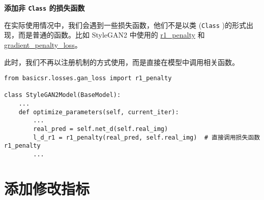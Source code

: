 \documentclass[../main.tex]{subfiles}
\begin{document}
\begin{hl} %
    \textbf{添加非 \texttt{Class} 的损失函数}

    在实际使用情况中，我们会遇到一些损失函数，他们不是以类 (\texttt{Class} )的形式出现，而是普通的函数。比如 StyleGAN2 中使用的 \href{https://github.com/XPixelGroup/BasicSR/blob/master/basicsr/losses/gan_loss.py}{r1\_penalty} 和 \href{https://github.com/XPixelGroup/BasicSR/blob/master/basicsr/losses/gan_loss.py}{gradient\_penalty\_loss}。

    此时，我们不再以注册机制的方式使用，而是直接在模型中调用相关函数。
\begin{verbatim}
from basicsr.losses.gan_loss import r1_penalty

class StyleGAN2Model(BaseModel):
    ...
    def optimize_parameters(self, current_iter):
        ...
        real_pred = self.net_d(self.real_img)
        l_d_r1 = r1_penalty(real_pred, self.real_img)  # 直接调用损失函数 r1_penalty
        ...
\end{verbatim}
\end{hl}

\section{添加修改指标}\label{howto:add_metric}
\end{document}
